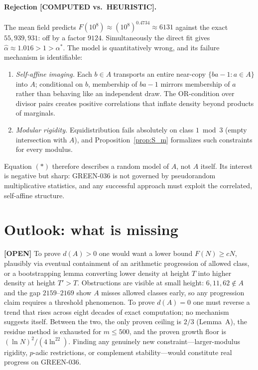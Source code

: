 \documentclass[11pt]{article}
\theoremstyle{definition}
\newcommand{\A}{A}
\newcommand{\F}{F}
\begin{document}
\paragraph{Rejection [COMPUTED vs.\ HEURISTIC].} The mean field predicts
$\F(10^8)\approx(10^8)^{0.4734}\approx6131$ against the exact
$55{,}939{,}931$: off by a factor $9124$. Simultaneously the direct fit gives
$\hat\alpha\approx1.016>1>\alpha^\ast$. The model is quantitatively wrong, and
its failure mechanism is identifiable:
\begin{enumerate}
\item \emph{Self-affine imaging.} Each $b\in\A$ transports an entire
near-copy $\{ba-1: a\in\A\}$ into $\A$; conditional on $b$, membership of
$ba-1$ mirrors membership of $a$ rather than behaving like an independent
draw. The OR-condition over divisor pairs creates positive correlations that
inflate density beyond products of marginals.
\item \emph{Modular rigidity.} Equidistribution fails absolutely on class
$1\bmod3$ (empty intersection with $\A$), and Proposition~\ref{prop:S_m}
formalizes such constraints for every modulus.
\end{enumerate}
Equation $(\ast)$ therefore describes a random model of $\A$, not $\A$ itself.
Its interest is negative but sharp: GREEN-036 is not governed by
pseudorandom multiplicative statistics, and any successful approach must
exploit the correlated, self-affine structure.

\section{Outlook: what is missing}\label{sec:outlook}

\textbf{[OPEN]} To prove $d(\A)>0$ one would want a lower bound $\F(N)\ge cN$,
plausibly via eventual containment of an arithmetic progression of allowed
class, or a bootstrapping lemma converting lower density at height $T$ into
higher density at height $T'>T$. Obstructions are visible at small height:
$6,11,62\notin\A$ and the gap $2159$--$2169$ show $\A$ misses allowed classes
early, so any progression claim requires a threshold phenomenon. To prove
$d(\A)=0$ one must reverse a trend that rises across eight decades of exact
computation; no mechanism suggests itself. Between the two, the only proven
ceiling is $2/3$ (Lemma~A), the residue method is exhausted for $m\le500$, and
the proven growth floor is $(\ln N)^2/(4\ln^22)$. Finding any genuinely new
constraint---larger-modulus rigidity, $p$-adic restrictions, or complement
stability---would constitute real progress on GREEN-036.
\end{document}
